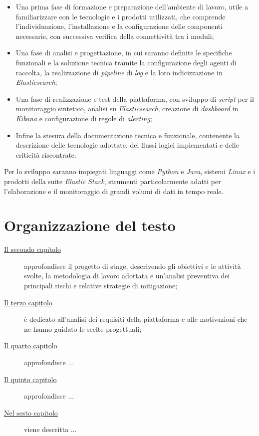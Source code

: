 \begin{itemize}
    \item Una prima fase di formazione e preparazione dell'ambiente di lavoro, utile a familiarizzare con le tecnologie e i prodotti utilizzati, che comprende l'individuazione, l'installazione e la configurazione delle componenti necessarie, con successiva verifica della connettività tra i moduli;
    \item Una fase di analisi e progettazione, in cui saranno definite le specifiche funzionali e la soluzione tecnica tramite la configurazione degli agenti di raccolta, la realizzazione di \emph{pipeline} di \emph{log} e la loro indicizzazione in \emph{Elasticsearch};
    \item Una fase di realizzazione e test della piattaforma, con sviluppo di \emph{script} per il monitoraggio sintetico, analisi su \emph{Elasticsearch}, creazione di \emph{dashboard} in \emph{Kibana} e configurazione di regole di \emph{alerting};
    \item Infine la stesura della documentazione tecnica e funzionale, contenente la descrizione delle tecnologie adottate, dei flussi logici implementati e delle criticità riscontrate.
\end{itemize}

Per lo sviluppo saranno impiegati linguaggi come \emph{Python} e \emph{Java}, sistemi \emph{Linux} e i prodotti della suite \emph{Elastic Stack}, strumenti particolarmente adatti per l'elaborazione e il monitoraggio di grandi volumi di dati in tempo reale.


\section{Organizzazione del testo}

\begin{description}
    \item[{\hyperref[cap:descrizione-stage]{Il secondo capitolo}}] approfondisce il progetto di stage, descrivendo gli obiettivi e le attività svolte, la metodologia di lavoro adottata e un'analisi preventiva dei principali rischi e relative strategie di mitigazione;

    \item[{\hyperref[cap:analisi-requisiti]{Il terzo capitolo}}] è dedicato all'analisi dei requisiti della piattaforma e alle motivazioni che ne hanno guidato le scelte progettuali;

    \item[{\hyperref[cap:progettazione-codifica]{Il quarto capitolo}}] approfondisce ...
    
    \item[{\hyperref[cap:verifica-validazione]{Il quinto capitolo}}] approfondisce ...
    
    \item[{\hyperref[cap:conclusioni]{Nel sesto capitolo}}] viene descritta ...
\end{description}

